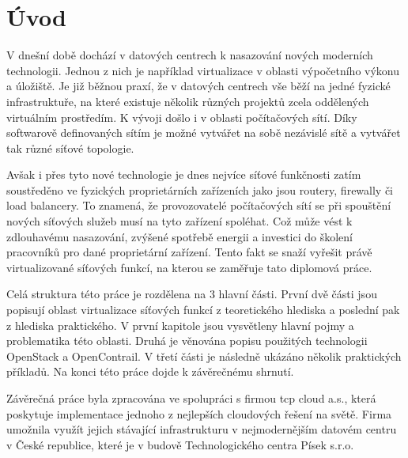 
\chapter{Úvod}

V dnešní době dochází v datových centrech k nasazování nových moderních technologii. Jednou z nich je například virtualizace v oblasti výpočetního výkonu a úložiště. Je již běžnou praxí, že v datových centrech vše běží na jedné fyzické infrastruktuře, na které existuje několik různých projektů zcela oddělených virtuálním prostředím. K vývoji došlo i v oblasti počítačových sítí. Díky softwarově definovaných sítím je možné vytvářet na sobě nezávislé sítě a vytvářet tak různé síťové topologie.  

Avšak i přes tyto nové technologie je dnes nejvíce síťové funkčnosti zatím soustředěno ve fyzických proprietárních zařízeních jako jsou routery, firewally či load balancery. To znamená, že provozovatelé počítačových sítí se při spouštění nových síťových služeb musí na tyto zařízení spoléhat. Což může vést k zdlouhavému nasazování, zvýšené spotřebě energii a investici do školení pracovníků pro dané proprietární zařízení. Tento fakt se snaží vyřešit právě virtualizované síťových funkcí, na kterou se zaměřuje tato diplomová práce.

Celá struktura této práce je rozdělena na 3 hlavní části. První dvě části jsou popisují oblast virtualizace síťových funkcí z teoretického hlediska a poslední pak z hlediska praktického. V první kapitole jsou vysvětleny hlavní pojmy a problematika této oblasti. Druhá je věnována popisu použitých technologii OpenStack a OpenContrail. V třetí části je následně ukázáno několik praktických příkladů. Na konci této práce dojde k závěrečnému shrnutí.

Závěrečná práce byla zpracována ve spolupráci s firmou tcp cloud a.s., která poskytuje implementace jednoho z nejlepších cloudových řešení na světě. Firma umožnila využít jejich stávající infrastrukturu v nejmodernějším datovém centru v České republice, které je v budově Technologického centra Písek s.r.o.



